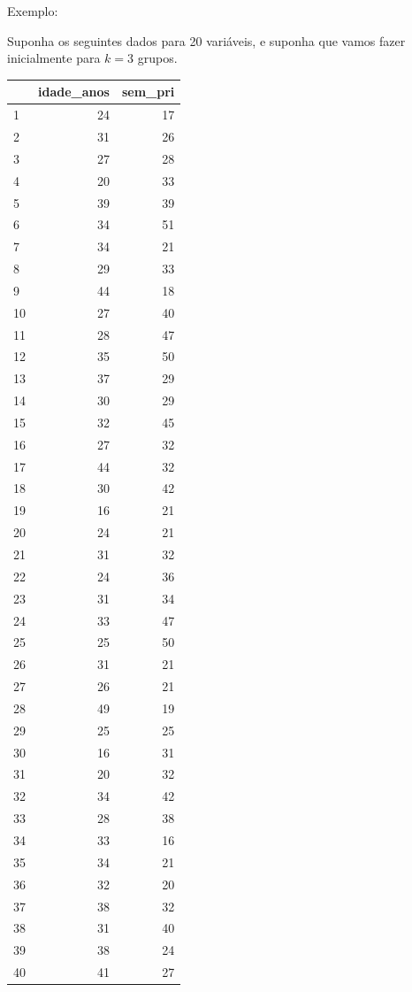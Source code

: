\documentclass[
  letterpaper,
  DIV=11,
  numbers=noendperiod]{scrreprt}
\begin{document}
Exemplo:

Suponha os seguintes dados para 20 variáveis, e suponha que vamos fazer
inicialmente para \(k=3\) grupos.

\begin{longtable}[]{@{}lrr@{}}
\toprule()
& idade\_anos & sem\_pri \\
\midrule()
\endhead
1 & 24 & 17 \\
2 & 31 & 26 \\
3 & 27 & 28 \\
4 & 20 & 33 \\
5 & 39 & 39 \\
6 & 34 & 51 \\
7 & 34 & 21 \\
8 & 29 & 33 \\
9 & 44 & 18 \\
10 & 27 & 40 \\
11 & 28 & 47 \\
12 & 35 & 50 \\
13 & 37 & 29 \\
14 & 30 & 29 \\
15 & 32 & 45 \\
16 & 27 & 32 \\
17 & 44 & 32 \\
18 & 30 & 42 \\
19 & 16 & 21 \\
20 & 24 & 21 \\
21 & 31 & 32 \\
22 & 24 & 36 \\
23 & 31 & 34 \\
24 & 33 & 47 \\
25 & 25 & 50 \\
26 & 31 & 21 \\
27 & 26 & 21 \\
28 & 49 & 19 \\
29 & 25 & 25 \\
30 & 16 & 31 \\
31 & 20 & 32 \\
32 & 34 & 42 \\
33 & 28 & 38 \\
34 & 33 & 16 \\
35 & 34 & 21 \\
36 & 32 & 20 \\
37 & 38 & 32 \\
38 & 31 & 40 \\
39 & 38 & 24 \\
40 & 41 & 27 \\
\bottomrule()
\end{longtable}
\end{document}
